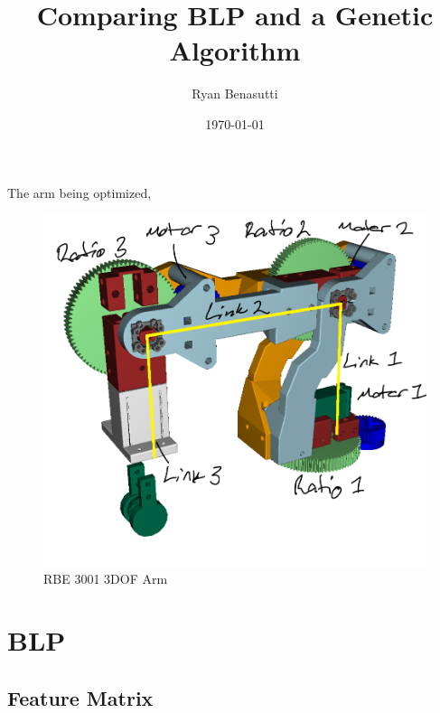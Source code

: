 \documentclass{article}
\title{Comparing BLP and a Genetic Algorithm}
\author{Ryan Benasutti}
\date{\today}
\begin{document}
\maketitle

The arm being optimized,
\begin{figure}[h]
    \centering
    \includegraphics[scale=0.3]{annotated-arm.png}
    \caption{RBE 3001 3DOF Arm}
    \label{fig:annotated_arn}
\end{figure}

\FloatBarrier{}
\section{BLP}

\FloatBarrier{}
\subsection{Feature Matrix}
\end{document}
